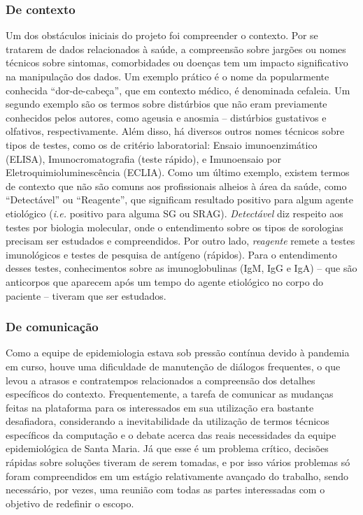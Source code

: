 \subsubsection*{De contexto}

Um dos obstáculos iniciais do projeto foi compreender o contexto. 
Por se tratarem de dados relacionados à saúde, a compreensão sobre jargões ou nomes técnicos sobre sintomas, comorbidades ou doenças tem um impacto significativo na manipulação dos dados. 
Um exemplo prático é o nome da popularmente conhecida ``dor-de-cabeça'', que em contexto médico, é denominada cefaleia. 
Um segundo exemplo são os termos sobre distúrbios que não eram previamente conhecidos pelos autores, como ageusia e anosmia -- distúrbios gustativos e olfativos, respectivamente. 
Além disso, há diversos outros nomes técnicos sobre tipos de testes, como os de critério laboratorial: Ensaio imunoenzimático (ELISA), Imunocromatografia (teste rápido),  e Imunoensaio por Eletroquimioluminescência (ECLIA). 
Como um último exemplo, existem termos de contexto que não são comuns aos profissionais alheios à área da saúde, como ``Detectável'' ou ``Reagente'', que significam resultado positivo para algum agente etiológico (\textit{i.e.} positivo para alguma SG ou SRAG). 
\textit{Detectável} diz respeito aos testes por biologia molecular, onde o entendimento sobre os tipos de sorologias precisam ser estudados e compreendidos.
Por outro lado, \textit{reagente} remete a testes imunológicos e testes de pesquisa de antígeno (rápidos). Para o entendimento desses testes, conhecimentos sobre as imunoglobulinas (IgM, IgG e IgA) -- que são anticorpos que aparecem após um tempo do agente etiológico no corpo do paciente -- tiveram que ser estudados. 

 
\subsubsection*{De comunicação}

Como a equipe de epidemiologia estava sob pressão contínua devido à pandemia em curso, houve uma dificuldade de manutenção de diálogos frequentes, o que levou a atrasos e contratempos relacionados a compreensão dos detalhes específicos do contexto. 
Frequentemente, a tarefa de comunicar as mudanças feitas na plataforma para os interessados em sua utilização era bastante desafiadora, considerando a inevitabilidade da utilização de termos técnicos específicos da computação e o debate acerca das reais necessidades da equipe epidemiológica de Santa Maria. Já que esse é um problema crítico, decisões rápidas sobre soluções tiveram de serem tomadas, e por isso vários problemas só foram compreendidos em um estágio relativamente avançado do trabalho, sendo necessário, por vezes, uma reunião com todas as partes interessadas com o objetivo de redefinir o escopo.
 
